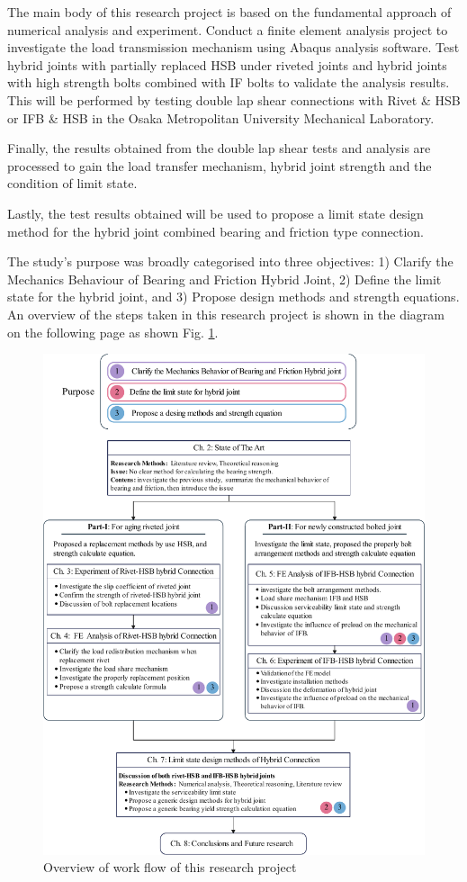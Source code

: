The main body of this research project is based on the fundamental approach of numerical analysis and experiment. Conduct a finite element analysis project to investigate the load transmission mechanism using Abaqus analysis software. Test hybrid joints with partially replaced HSB under riveted joints and hybrid joints with high strength bolts combined with IF bolts to validate the analysis results. This will be performed by testing double lap shear connections with Rivet \& \ac{HSB} or \ac{IFB} \& HSB in the Osaka Metropolitan University Mechanical Laboratory.

Finally, the results obtained from the double lap shear tests and analysis are processed to gain the load transfer mechanism, hybrid joint strength and the condition of limit state.

Lastly, the test results obtained will be used to propose a limit state design method for the hybrid joint combined bearing and friction type connection.

The study's purpose was broadly categorised into three objectives: 1) Clarify the Mechanics Behaviour of Bearing and Friction Hybrid Joint, 2) Define the limit state for the hybrid joint, and 3) Propose design methods and strength equations. An overview of the steps taken in this research project is shown in the diagram on the following page as shown Fig. \ref{fig-rflow}.

\begin{figure}
    \centering
    \includegraphics[width=\textwidth]{imgs/intro/research-flow.pdf}
    \caption{Overview of work flow of this research project}
    \label{fig-rflow}
\end{figure}